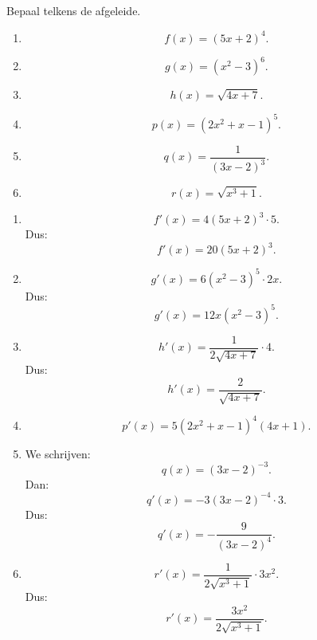 \documentclass{ximera}
\begin{document}
\begin{oefening}{\oefB\ESS}

Bepaal telkens de afgeleide.

\begin{enumerate}
  \item \[f(x)=(5x+2)^4.\]
  \item \[g(x)=(x^2-3)^6.\]
  \item \[h(x)=\sqrt{4x+7}.\]
  \item \[p(x)=(2x^2+x-1)^5.\]
  \item \[q(x)=\frac{1}{(3x-2)^3}.\]
  \item \[r(x)=\sqrt{x^3+1}.\]
\end{enumerate}

\begin{oplossing}
\begin{enumerate}
  \item \[f'(x)=4(5x+2)^3\cdot5.\]
  Dus:
  \[\boxed{f'(x)=20(5x+2)^3.}\]

  \item \[g'(x)=6(x^2-3)^5\cdot2x.\]
  Dus:
  \[\boxed{g'(x)=12x(x^2-3)^5.}\]

  \item \[h'(x)=\frac{1}{2\sqrt{4x+7}}\cdot4.\]
  Dus:
  \[\boxed{h'(x)=\frac{2}{\sqrt{4x+7}}.}\]

  \item \[p'(x)=5(2x^2+x-1)^4(4x+1).\]

  \item We schrijven:
  \[q(x)=(3x-2)^{-3}.\]
  Dan:
  \[q'(x)=-3(3x-2)^{-4}\cdot3.\]
  Dus:
  \[\boxed{q'(x)=-\frac{9}{(3x-2)^4}.}\]

  \item \[r'(x)=\frac{1}{2\sqrt{x^3+1}}\cdot3x^2.\]
  Dus:
  \[\boxed{r'(x)=\frac{3x^2}{2\sqrt{x^3+1}}.}\]
\end{enumerate}
\end{oplossing}

\end{oefening}
\end{document}
